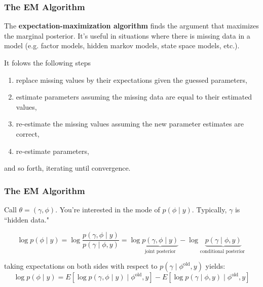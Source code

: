 \documentclass{beamer}
\begin{document}
\begin{frame}[fragile]
\frametitle{The EM Algorithm}

The {\bf expectation-maximization algorithm} finds the argument that maximizes the marginal posterior. It's useful in situations where there is missing data in a model (e.g. factor models, hidden markov models, state space models, etc.). 
\newline

It folows the following steps
\begin{enumerate}
\item replace missing values by their expectations given the guessed parameters, 
\item estimate parameters assuming the missing data are equal to their estimated values, 
\item re-estimate the missing values assuming the new parameter estimates are correct,
\item re-estimate parameters, 
\end{enumerate}
and so forth, iterating until convergence.

\end{frame}


\begin{frame}[fragile]
\frametitle{The EM Algorithm}

Call $\theta = (\gamma, \phi)$. You're interested in the mode of $p(\phi \mid y)$. Typically, $\gamma$ is ``hidden data."
\newline

$$
\log p(\phi \mid y) = \log \frac{p(\gamma, \phi \mid y)}{p(\gamma \mid \phi, y)} = \log \underbrace{p(\gamma, \phi \mid y)}_{ \text{joint posterior} } - \log \underbrace{p(\gamma \mid \phi, y)}_{\text{conditional posterior }}
$$
\pause

taking expectations on both sides with respect to $p(\gamma \mid \phi^{\text{old}}, y)$ yields:
$$
\log p(\phi \mid y) =  E\left[ \log p(\gamma, \phi \mid y) \mid \phi^{\text{old}}, y \right] - E\left[\log p(\gamma \mid \phi, y) \mid \phi^{\text{old}}, y \right]
$$




\end{frame}
\end{document}
